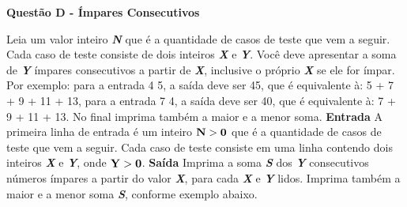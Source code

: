 \documentclass[a4paper, 12pt]{article}
\begin{document}
\newpage %
\begin{center}
\textbf{{\Large Questão D - Ímpares Consecutivos}}
\end{center}
\vspace{5pt}
Leia um valor inteiro \textbf{\textit{N}} que é a quantidade de casos de teste que vem a seguir. Cada caso de teste consiste de dois inteiros \textbf{\textit{X}} e \textbf{\textit{Y}}. Você deve apresentar a soma de \textbf{\textit{Y}} ímpares consecutivos a partir de \textbf{\textit{X}}, inclusive o próprio \textbf{\textit{X}} se ele for ímpar. Por exemplo: para a entrada 4 5, a saída deve ser 45, que é equivalente à: 5 + 7 + 9 + 11 + 13, para a entrada 7 4, a saída deve ser 40, que é equivalente à: 7 + 9 + 11 + 13. No final imprima também a maior e a menor soma.
\newline \newline
\textbf{{\large Entrada}} \newline 
A primeira linha de entrada é um inteiro $\textrm{\textbf{N}} > \textrm{\textbf{0}}$ que é a quantidade de casos de teste que vem a seguir. Cada caso de teste consiste em uma linha contendo dois inteiros \textbf{\textit{X}} e \textbf{\textit{Y}}, onde $\textrm{\textbf{Y}} > \textrm{\textbf{0}}$.
\newline \newline
\textbf{{\large Saída}} \newline
Imprima a soma \textbf{\textit{S}} dos \textbf{\textit{Y}} consecutivos números ímpares a partir do valor \textbf{\textit{X}}, para cada \textbf{\textit{X}} e \textbf{\textit{Y}} lidos. Imprima também a maior e a menor soma \textbf{\textit{S}}, conforme exemplo abaixo.
\newline
\end{document}
